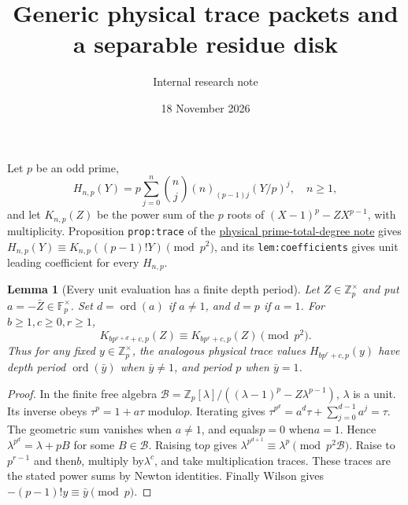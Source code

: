 \documentclass[11pt]{article}
\newtheorem{lemma}{Lemma}\newtheorem{theorem}[lemma]{Theorem}
\begin{document}
\title{Generic physical trace packets and a separable residue disk}
\author{Internal research note}\date{18 November 2026}\maketitle
Let $p$ be an odd prime,
\[
 H_{n,p}(Y)=p\sum_{j=0}^n\binom nj(n)_{(p-1)j}(Y/p)^j,\quad n\ge1,
\]
and let $K_{n,p}(Z)$ be the power sum of the $p$ roots of
$(X-1)^p-ZX^{p-1}$, with multiplicity.
Proposition \texttt{prop:trace} of the
\href{PHYSICAL_PRIME_TOTAL_DEGREE_REDUCTION.tex}{physical prime-total-degree note} gives
$H_{n,p}(Y)\equiv K_{n,p}((p-1)!Y)\pmod{p^2}$,
and its \texttt{lem:coefficients} gives unit leading coefficient
for every $H_{n,p}$.

\begin{lemma}[Every unit evaluation has a finite depth period]\label{lem:unit-period}
Let $Z\in\mathbb Z_p^\times$ and put $a=-\bar Z\in\mathbb F_p^\times$.
Set $d=\operatorname{ord}(a)$ if $a\ne1$, and $d=p$ if $a=1$.
For $b\ge1,c\ge0,r\ge1$,
\[
 K_{bp^{r+d}+c,p}(Z)\equiv K_{bp^r+c,p}(Z)\pmod{p^2}.
\]
Thus for any fixed $y\in\mathbb Z_p^\times$, the analogous physical
trace values $H_{bp^r+c,p}(y)$ have depth period
$\operatorname{ord}(\bar y)$ when $\bar y\ne1$, and period $p$
when $\bar y=1$.
\end{lemma}
\begin{proof}
In the finite free algebra
$\mathcal B=\mathbb Z_p[\lambda]/((\lambda-1)^p-Z\lambda^{p-1})$,
$\lambda$ is a unit. Its inverse obeys
$\tau^p=1+a\tau$ modulo$p$.
Iterating gives
$\tau^{p^d}=a^d\tau+\sum_{j=0}^{d-1}a^j=\tau$.
The geometric sum vanishes when $a\ne1$, and equals$p=0$ when$a=1$.
Hence $\lambda^{p^d}=\lambda+pB$ for some $B\in\mathcal B$.
Raising to$p$ gives
$\lambda^{p^{d+1}}\equiv\lambda^p\pmod{p^2\mathcal B}$.
Raise to $p^{r-1}$ and then$b$, multiply by$\lambda^c$, and take
multiplication traces. These traces are the stated power sums by
Newton identities. Finally Wilson gives
$-(p-1)!y\equiv\bar y\pmod p$.
\end{proof}
\end{document}
